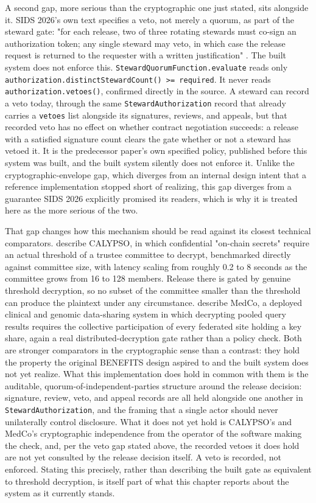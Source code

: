 A second gap, more serious than the cryptographic one just stated, sits alongside it. SIDS 2026's own text specifies a veto, not merely a quorum, as part of the steward gate: "for each release, two of three rotating stewards must co-sign an authorization token; any single steward may veto, in which case the release request is returned to the requester with a written justification" \cite{katrakazas2026}. The built system does not enforce this. \texttt{StewardQuorumFunction.evaluate} reads only \texttt{authorization.distinctStewardCount() >= required}. It never reads \texttt{authorization.vetoes()}, confirmed directly in the source. A steward can record a veto today, through the same \texttt{StewardAuthorization} record that already carries a \texttt{vetoes} list alongside its signatures, reviews, and appeals, but that recorded veto has no effect on whether contract negotiation succeeds: a release with a satisfied signature count clears the gate whether or not a steward has vetoed it. It is the predecessor paper's own specified policy, published before this system was built, and the built system silently does not enforce it. Unlike the cryptographic-envelope gap, which diverges from an internal design intent that a reference implementation stopped short of realizing, this gap diverges from a guarantee SIDS 2026 explicitly promised its readers, which is why it is treated here as the more serious of the two.

That gap changes how this mechanism should be read against its closest technical comparators. \cite{kokoriskogias2020} describe CALYPSO, in which confidential "on-chain secrets" require an actual threshold of a trustee committee to decrypt, benchmarked directly against committee size, with latency scaling from roughly 0.2 to 8 seconds as the committee grows from 16 to 128 members. Release there is gated by genuine threshold decryption, so no subset of the committee smaller than the threshold can produce the plaintext under any circumstance. \cite{raisaro2019} describe MedCo, a deployed clinical and genomic data-sharing system in which decrypting pooled query results requires the collective participation of every federated site holding a key share, again a real distributed-decryption gate rather than a policy check. Both are stronger comparators in the cryptographic sense than a contrast: they hold the property the original BENEFITS design aspired to and the built system does not yet realize. What this implementation does hold in common with them is the auditable, quorum-of-independent-parties structure around the release decision: signature, review, veto, and appeal records are all held alongside one another in \texttt{StewardAuthorization}, and the framing that a single actor should never unilaterally control disclosure. What it does not yet hold is CALYPSO's and MedCo's cryptographic independence from the operator of the software making the check, and, per the veto gap stated above, the recorded vetoes it does hold are not yet consulted by the release decision itself. A veto is recorded, not enforced. Stating this precisely, rather than describing the built gate as equivalent to threshold decryption, is itself part of what this chapter reports about the system as it currently stands.


